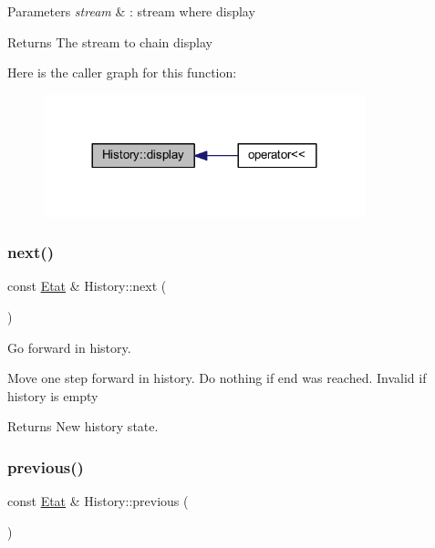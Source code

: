 \begin{DoxyParams}{Parameters}
{\em stream} & \+: stream where display\\
\hline
\end{DoxyParams}
\begin{DoxyReturn}{Returns}
The stream to chain display 
\end{DoxyReturn}
Here is the caller graph for this function\+:\nopagebreak
\begin{figure}[H]
\begin{center}
\leavevmode
\includegraphics[width=264pt]{class_history_a5c1724d84912d1571d2475b2fb703081_icgraph}
\end{center}
\end{figure}
\mbox{\label{class_history_ab0535cf179200bf8a79a854aac783aa1}} 
\subsubsection{\texorpdfstring{next()}{next()}}
{\footnotesize\ttfamily const \hyperlink{class_etat}{Etat} \& History\+::next (\begin{DoxyParamCaption}{ }\end{DoxyParamCaption})}



Go forward in history. 

Move one step forward in history. Do nothing if end was reached. Invalid if history is empty

\begin{DoxyReturn}{Returns}
New history state. 
\end{DoxyReturn}
\mbox{\label{class_history_a8a0bb0748169bc93404987108a14f4bc}} 
\subsubsection{\texorpdfstring{previous()}{previous()}}
{\footnotesize\ttfamily const \hyperlink{class_etat}{Etat} \& History\+::previous (\begin{DoxyParamCaption}{ }\end{DoxyParamCaption})}



